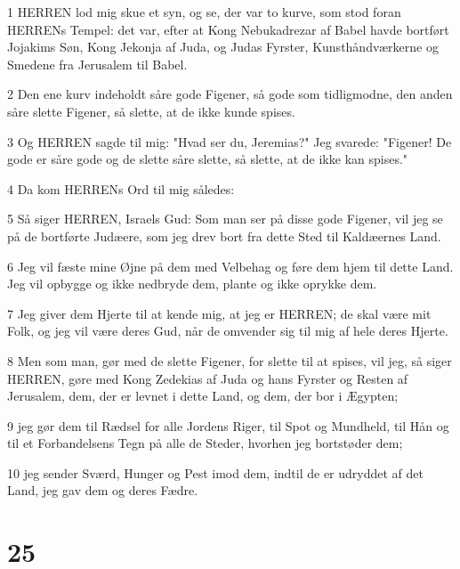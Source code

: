 \par 1 HERREN lod mig skue et syn, og se, der var to kurve, som stod foran HERRENs Tempel: det var, efter at Kong Nebukadrezar af Babel havde bortført Jojakims Søn, Kong Jekonja af Juda, og Judas Fyrster, Kunsthåndværkerne og Smedene fra Jerusalem til Babel.
\par 2 Den ene kurv indeholdt såre gode Figener, så gode som tidligmodne, den anden såre slette Figener, så slette, at de ikke kunde spises.
\par 3 Og HERREN sagde til mig: "Hvad ser du, Jeremias?" Jeg svarede: "Figener! De gode er såre gode og de slette såre slette, så slette, at de ikke kan spises."
\par 4 Da kom HERRENs Ord til mig således:
\par 5 Så siger HERREN, Israels Gud: Som man ser på disse gode Figener, vil jeg se på de bortførte Judæere, som jeg drev bort fra dette Sted til Kaldæernes Land.
\par 6 Jeg vil fæste mine Øjne på dem med Velbehag og føre dem hjem til dette Land. Jeg vil opbygge og ikke nedbryde dem, plante og ikke oprykke dem.
\par 7 Jeg giver dem Hjerte til at kende mig, at jeg er HERREN; de skal være mit Folk, og jeg vil være deres Gud, når de omvender sig til mig af hele deres Hjerte.
\par 8 Men som man, gør med de slette Figener, for slette til at spises, vil jeg, så siger HERREN, gøre med Kong Zedekias af Juda og hans Fyrster og Resten af Jerusalem, dem, der er levnet i dette Land, og dem, der bor i Ægypten;
\par 9 jeg gør dem til Rædsel for alle Jordens Riger, til Spot og Mundheld, til Hån og til et Forbandelsens Tegn på alle de Steder, hvorhen jeg bortstøder dem;
\par 10 jeg sender Sværd, Hunger og Pest imod dem, indtil de er udryddet af det Land, jeg gav dem og deres Fædre.

\chapter{25}

